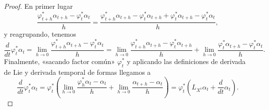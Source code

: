   \begin{proof}
    En primer lugar
    \begin{equation*}
      \frac{\varphi^*_{t+h}\alpha_{t+h}-\varphi^*_t\alpha_t}{h}= \frac{\varphi^*_{t+h}\alpha_{t+h}-\varphi^*_t\alpha_{t+h}+\varphi^*_t\alpha_{t+h}-\varphi^*_t\alpha_t}{h},
    \end{equation*}
    y reagrupando, tenemos
    \begin{equation*}
      \frac{d}{dt}\varphi^*_t \alpha_t=\lim_{h\rightarrow 0}\frac{\varphi^*_{t+h}\alpha_{t+h}-\varphi^*_t\alpha_{t}}{h}=\lim_{h\rightarrow 0}\frac{\varphi^*_{t+h}\alpha_{t+h}-\varphi^*_t\alpha_{t+h}}{h}+\lim_{h\rightarrow 0}\frac{\varphi^*_t\alpha_{t+h}-\varphi^*_t\alpha_t}{h}.
    \end{equation*}
    Finalmente, «sacando factor común» $\varphi^*_t$ y aplicando las definiciones de derivada de Lie y derivada temporal de formas llegamos a
    \begin{equation*}
      \frac{d}{dt}\varphi^*_t \alpha_t=\varphi^*_t \left( \lim_{h\rightarrow 0}\frac{\varphi^*_{h}\alpha_{t}-\alpha_{t}}{h}+\lim_{h\rightarrow 0}\frac{\alpha_{t+h}-\alpha_t}{h}\right)=\varphi^*_t\left(L_{X^t}\alpha_t + \frac{d}{dt}\alpha_t\right).
    \end{equation*}
  \end{proof}
